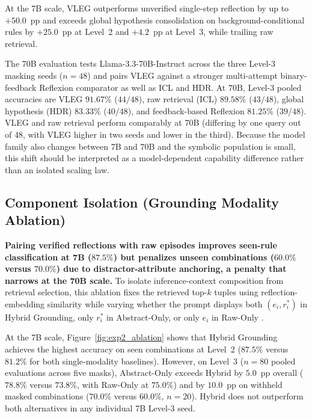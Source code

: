 \documentclass[10pt,a4paper,onecolumn]{article}
\theoremstyle{definition}
\theoremstyle{remark}
\begin{document}
At the 7B scale, VLEG outperforms unverified single-step reflection by up to $+50.0$~pp and exceeds global hypothesis consolidation on background-conditional rules by $+25.0$~pp at Level~2 and $+4.2$~pp at Level~3, while trailing raw retrieval.

The 70B evaluation tests Llama-3.3-70B-Instruct across the three Level-3 masking seeds ($n=48$) and pairs VLEG against a stronger multi-attempt binary-feedback Reflexion comparator as well as ICL and HDR. At 70B, Level-3 pooled accuracies are VLEG $91.67\%$ ($44/48$), raw retrieval (ICL) $89.58\%$ ($43/48$), global hypothesis (HDR) $83.33\%$ ($40/48$), and feedback-based Reflexion $81.25\%$ ($39/48$). VLEG and raw retrieval perform comparably at 70B (differing by one query out of 48, with VLEG higher in two seeds and lower in the third). Because the model family also changes between 7B and 70B and the symbolic population is small, this shift should be interpreted as a model-dependent capability difference rather than an isolated scaling law.

\subsection{Component Isolation (Grounding Modality Ablation)}
\label{sec:exp2}
\textbf{Pairing verified reflections with raw episodes improves seen-rule classification at 7B ($87.5\%$) but penalizes unseen combinations ($60.0\%$ versus $70.0\%$) due to distractor-attribute anchoring, a penalty that narrows at the 70B scale.} To isolate inference-context composition from retrieval selection, this ablation fixes the retrieved top-$k$ tuples using reflection-embedding similarity while varying whether the prompt displays both $(e_i, r_i^*)$ in Hybrid Grounding, only $r_i^*$ in Abstract-Only, or only $e_i$ in Raw-Only \cite{brown2020language}.

At the 7B scale, Figure~\ref{fig:exp2_ablation} shows that Hybrid Grounding achieves the highest accuracy on seen combinations at Level~2 ($87.5\%$ versus $81.2\%$ for both single-modality baselines). However, on Level~3 ($n=80$ pooled evaluations across five masks), Abstract-Only exceeds Hybrid by $5.0$~pp overall ($78.8\%$ versus $73.8\%$, with Raw-Only at $75.0\%$) and by $10.0$~pp on withheld masked combinations ($70.0\%$ versus $60.0\%$, $n=20$). Hybrid does not outperform both alternatives in any individual 7B Level-3 seed.
\end{document}
